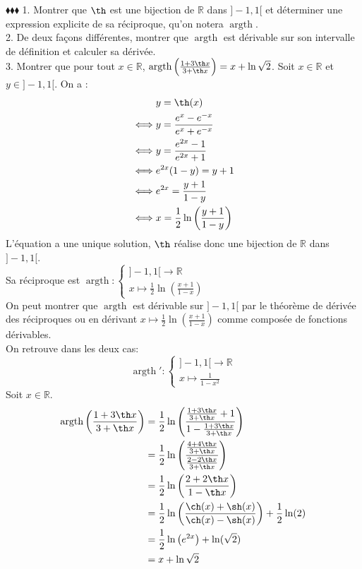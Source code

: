 \documentclass[11pt]{article}
\DeclareMathOperator{\argth}{argth}
\begin{document}
\begin{exercice}{$\blacklozenge\blacklozenge\blacklozenge$}{}
    1. Montrer que $\th$ est une bijection de $\mathbb{R}$ dans $\rbrack-1,1\lbrack$ et déterminer une expression explicite de sa réciproque, qu'on notera $\argth$.\\
    2. De deux façons différentes, montrer que $\argth$ est dérivable sur son intervalle de définition et calculer sa dérivée.\\
    3. Montrer que pour tout $x\in\mathbb{R}$, $\argth\left(\frac{1+3\th x}{3+\th x}\right)=x+\ln\sqrt{2}$.
    \tcblower
     Soit $x\in\mathbb{R}$ et $y\in\rbrack-1,1\lbrack$. On a :
    \begin{align*}
        &y=\th(x)\\
        \iff& y=\frac{e^x-e^{-x}}{e^x+e^{-x}}\\
        \iff& y=\frac{e^{2x}-1}{e^{2x}+1}\\
        \iff& e^{2x}(1-y)=y+1\\
        \iff &e^{2x}=\frac{y+1}{1-y}\\
        \iff &x=\frac{1}{2}\ln\left(\frac{y+1}{1-y}\right)
    \end{align*}
    L'équation a une unique solution, $\th$ réalise donc une bijection de $\mathbb{R}$ dans $\rbrack-1,1\lbrack$.\\
    Sa réciproque est $\argth:\begin{cases}\rbrack-1,1\lbrack\rightarrow\mathbb{R}\\x\mapsto\frac{1}{2}\ln\left(\frac{x+1}{1-x}\right)\end{cases}$\\[0.25cm]
     On peut montrer que $\argth$ est dérivable sur $]-1,1[$ par le théorème de dérivée des réciproques ou en dérivant $x\mapsto\frac{1}{2}\ln\left(\frac{x+1}{1-x}\right)$ comme composée de fonctions dérivables.\\
    On retrouve dans les deux cas:
    \begin{equation*}
        \argth':\begin{cases}]-1,1[\rightarrow\mathbb{R}\\x\mapsto\frac{1}{1-x^2}\end{cases}
    \end{equation*}
     Soit $x\in\mathbb{R}$.
    \begin{align*}
        \argth\left(\frac{1+3\th x}{3+\th x}\right)&=\frac{1}{2}\ln\left(\frac{\frac{1+3\th x}{3+\th x}+1}{1-\frac{1+3\th x}{3+\th x}}\right)\\
        &=\frac{1}{2}\ln\left(\frac{\frac{4+4\th x}{3+\th x}}{\frac{2-2\th x}{3 + \th x}}\right)\\
        &=\frac{1}{2}\ln\left(\frac{2+2\th x}{1-\th x}\right)\\
        &=\frac{1}{2}\ln\left(\frac{\ch(x)+\sh(x)}{\ch(x)-\sh(x)}\right)+\frac{1}{2}\ln(2)\\
        &=\frac{1}{2}\ln\left(e^{2x}\right)+\ln(\sqrt{2})\\
        &=x+\ln\sqrt{2}
    \end{align*}
\end{exercice}
\end{document}
